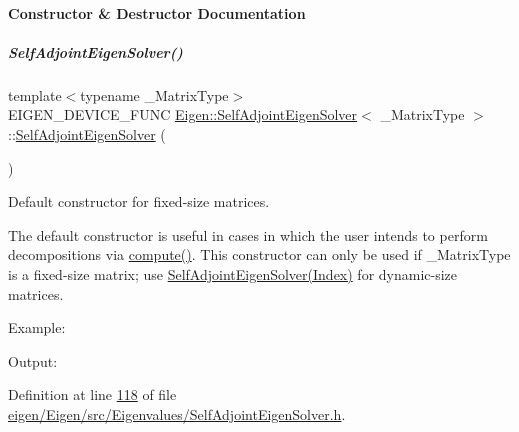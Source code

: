 \paragraph{Constructor \& Destructor Documentation}
\mbox{\label{group___eigenvalues___module_af3466b3809be4a7738d84493d80d4737}} 
\subparagraph{\texorpdfstring{Self\+Adjoint\+Eigen\+Solver()}{SelfAdjointEigenSolver()}\hspace{0.1cm}{\footnotesize\ttfamily [1/6]}}
{\footnotesize\ttfamily template$<$typename \+\_\+\+Matrix\+Type$>$ \\
E\+I\+G\+E\+N\+\_\+\+D\+E\+V\+I\+C\+E\+\_\+\+F\+U\+NC \hyperlink{group___eigenvalues___module_class_eigen_1_1_self_adjoint_eigen_solver}{Eigen\+::\+Self\+Adjoint\+Eigen\+Solver}$<$ \+\_\+\+Matrix\+Type $>$\+::\hyperlink{group___eigenvalues___module_class_eigen_1_1_self_adjoint_eigen_solver}{Self\+Adjoint\+Eigen\+Solver} (\begin{DoxyParamCaption}{ }\end{DoxyParamCaption})\hspace{0.3cm}{\ttfamily [inline]}}



Default constructor for fixed-\/size matrices. 

The default constructor is useful in cases in which the user intends to perform decompositions via \hyperlink{group___eigenvalues___module_a88bcdc24112efa7c4d2ebb3476efcbe9}{compute()}. This constructor can only be used if {\ttfamily \+\_\+\+Matrix\+Type} is a fixed-\/size matrix; use \hyperlink{group___eigenvalues___module_af20f466a4c29477271e91841e3382b27}{Self\+Adjoint\+Eigen\+Solver(\+Index)} for dynamic-\/size matrices.

Example\+: 
\begin{DoxyCodeInclude}
\end{DoxyCodeInclude}
 Output\+: 
\begin{DoxyVerbInclude}
\end{DoxyVerbInclude}
 

Definition at line \hyperlink{eigen_2_eigen_2src_2_eigenvalues_2_self_adjoint_eigen_solver_8h_source_l00118}{118} of file \hyperlink{eigen_2_eigen_2src_2_eigenvalues_2_self_adjoint_eigen_solver_8h_source}{eigen/\+Eigen/src/\+Eigenvalues/\+Self\+Adjoint\+Eigen\+Solver.\+h}.

